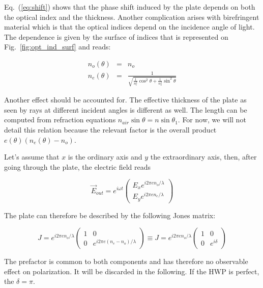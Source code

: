 \documentclass[a4paper,10pt]{article}
\begin{document}
Eq.~(\ref{eq:shift}) shows that the phase shift induced by the plate depends on
both the optical index and the thickness. Another complication arises with
birefringent material which is that the optical indices depend on the incidence
angle of light. The dependence is given by the surface of indices that is
represented on Fig.~\ref{fig:opt_ind_surf} and reads:

\begin{eqnarray}
n_o(\theta) & = & n_o \nonumber \\
n_e(\theta) & = & \frac{1}{\sqrt{\frac{1}{n^2_e}\cos^2\theta +
  \frac{1}{n_o^2}\sin^2\theta}} \nonumber
\end{eqnarray}

Another effect should be accounted for. The effective thickness of the plate as
seen by rays at different incident angles is different as well. The length can
be computed from refraction equations $n_{air}\sin\theta = n\sin\theta_1$. For
now, we will not detail this relation because the relevant factor is the overall
product $e(\theta)(n_e(\theta)-n_o)$.

Let's assume that $x$ is the ordinary axis and $y$ the extraordinary axis, then,
after going through the plate, the electric field reads

\begin{equation}
\vec{E}_{out} = e^{i\omega t}
\left(\begin{array}{l}
E_x e^{i 2\pi e n_o/\lambda}\\
E_y e^{i 2\pi e n_e/\lambda}\end{array}\right)
\end{equation}

The plate can therefore be described by the following Jones matrix:

\begin{equation}
J = e^{i 2\pi e n_o/\lambda}
\left(\begin{array}{ll}
1 & 0 \\
0 & e^{i 2\pi e (n_e-n_o)/\lambda}\end{array}\right) \equiv
J = e^{i 2\pi e n_o/\lambda}
\left(\begin{array}{ll}
1 & 0 \\
0 & e^{i \delta}\end{array}\right)
\label{eq:hwp_jones}
\end{equation}

The prefactor is common to both components and has therefore no observable
effect on polarization. It will be discarded in the following. If the HWP is
perfect, the $\delta=\pi$.
\end{document}
